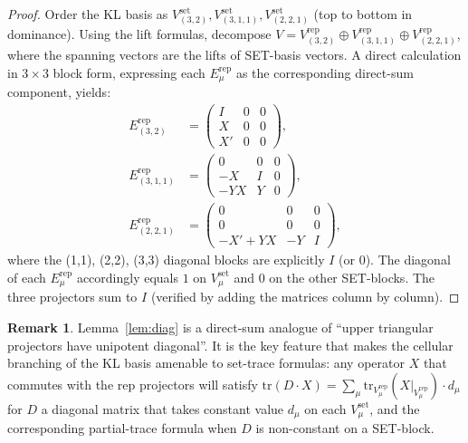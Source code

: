\documentclass[11pt]{article}
\theoremstyle{definition}
\newtheorem{remark}[theorem]{Remark}
\begin{document}
\begin{proof}
Order the KL basis as $V_{(3,2)}^{\mathrm{set}}, V_{(3,1,1)}^{\mathrm{set}}, V_{(2,2,1)}^{\mathrm{set}}$ (top to bottom in dominance). Using the lift formulas, decompose $V = V_{(3,2)}^{\mathrm{rep}} \oplus V_{(3,1,1)}^{\mathrm{rep}} \oplus V_{(2,2,1)}^{\mathrm{rep}}$, where the spanning vectors are the lifts of SET-basis vectors. A direct calculation in $3 \times 3$ block form, expressing each $E_\mu^{\mathrm{rep}}$ as the corresponding direct-sum component, yields:
\begin{align*}
E_{(3,2)}^{\mathrm{rep}} &= \begin{pmatrix} I & 0 & 0 \\ X & 0 & 0 \\ X' & 0 & 0 \end{pmatrix}, \\
E_{(3,1,1)}^{\mathrm{rep}} &= \begin{pmatrix} 0 & 0 & 0 \\ -X & I & 0 \\ -YX & Y & 0 \end{pmatrix},\\
E_{(2,2,1)}^{\mathrm{rep}} &= \begin{pmatrix} 0 & 0 & 0 \\ 0 & 0 & 0 \\ -X' + YX & -Y & I \end{pmatrix},
\end{align*}
where the (1,1), (2,2), (3,3) diagonal blocks are explicitly $I$ (or $0$). The diagonal of each $E_\mu^{\mathrm{rep}}$ accordingly equals $1$ on $V_\mu^{\mathrm{set}}$ and $0$ on the other SET-blocks. The three projectors sum to $I$ (verified by adding the matrices column by column). \qedhere
\end{proof}

\begin{remark}\label{rem:diag-significance}
Lemma~\ref{lem:diag} is a direct-sum analogue of ``upper triangular projectors have unipotent diagonal''. It is the key feature that makes the cellular branching of the KL basis amenable to set-trace formulas: any operator $X$ that commutes with the rep projectors will satisfy $\mathrm{tr}(D \cdot X) = \sum_\mu \mathrm{tr}_{V_\mu^{\mathrm{rep}}}(X|_{V_\mu^{\mathrm{rep}}}) \cdot d_\mu$ for $D$ a diagonal matrix that takes constant value $d_\mu$ on each $V_\mu^{\mathrm{set}}$, and the corresponding partial-trace formula when $D$ is non-constant on a SET-block.
\end{remark}
\end{document}
